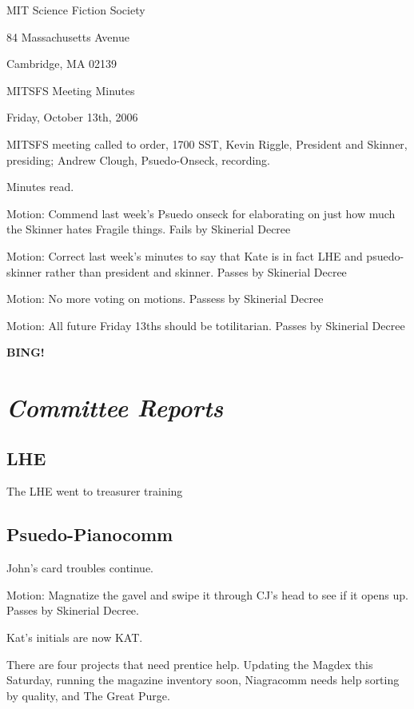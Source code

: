 \documentclass[10pt]{article}
\newcommand{\bing}{{\bf BING!} }
\newcommand{\goto}[1]{\bing \vskip 12pt \section*{{\em{#1}}}}
\begin{document}
\begin{center}

MIT Science Fiction Society

84 Massachusetts Avenue

Cambridge, MA 02139

\vspace{12pt}

MITSFS Meeting Minutes

Friday, October 13th, 2006

\end{center}

\vspace{18pt}

\setlength{\parskip}{6pt}

\noindent
MITSFS meeting called to order, 1700 SST,
Kevin Riggle, President and Skinner, presiding; Andrew Clough, Psuedo-Onseck, recording.

Minutes read.

Motion: Commend last week's Psuedo onseck for elaborating on just how
much the Skinner hates Fragile things.  Fails by Skinerial Decree

Motion: Correct last week's minutes to say that Kate is in fact LHE
and psuedo-skinner rather than president and skinner.  Passes by
Skinerial Decree

Motion:  No more voting on motions.  Passess by Skinerial Decree

Motion:  All future Friday 13ths should be totilitarian.  Passes by Skinerial Decree

\goto{Committee Reports}

\subsection*{LHE}

The LHE went to treasurer training

\subsection*{Psuedo-Pianocomm}

John's card troubles continue.

Motion:  Magnatize the gavel and swipe it through CJ's head to see if it opens up.  Passes by Skinerial Decree.

Kat's initials are now KAT.

There are four projects that need prentice help.  Updating the Magdex
this Saturday, running the magazine inventory soon, Niagracomm needs
help sorting by quality, and The Great Purge.
\end{document}
